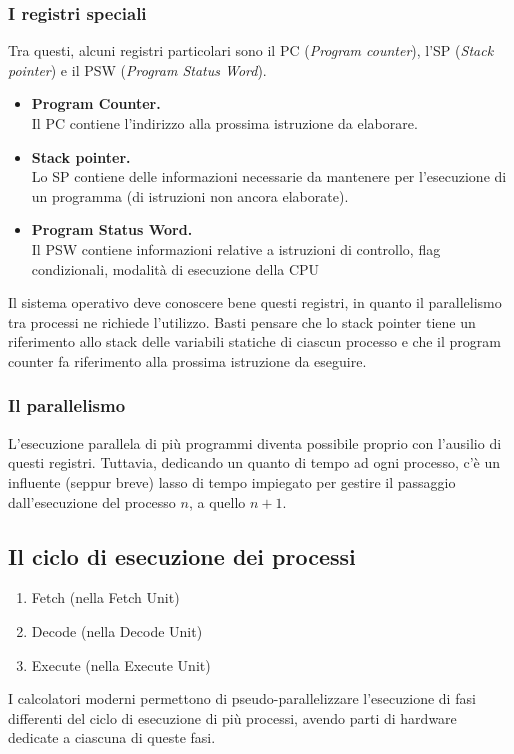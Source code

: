 \documentclass{report}
\begin{document}
\subsubsection{I registri speciali}
Tra questi, alcuni registri particolari sono il PC (\textit{Program counter}), l'SP (\textit{Stack pointer}) e il PSW (\textit{Program Status Word}).
\begin{itemize}
    \item \textbf{Program Counter.}\\
    Il PC contiene l'indirizzo alla prossima istruzione da elaborare.
    \item \textbf{Stack pointer.}\\
    Lo SP contiene delle informazioni necessarie da mantenere per l'esecuzione di un programma (di istruzioni non ancora elaborate).
    \item \textbf{Program Status Word.}\\
    Il PSW contiene informazioni relative a istruzioni di controllo, flag condizionali, modalità di esecuzione della CPU
\end{itemize}
Il sistema operativo deve conoscere bene questi registri, in quanto il parallelismo tra processi ne richiede l'utilizzo. Basti pensare che lo stack pointer tiene un riferimento allo stack delle variabili statiche di ciascun processo e che il program counter fa riferimento alla prossima istruzione da eseguire.

\subsubsection{Il parallelismo}
L'esecuzione parallela di più programmi diventa possibile proprio con l'ausilio di questi registri. Tuttavia, dedicando un quanto di tempo ad ogni processo, c'è un influente (seppur breve) lasso di tempo impiegato per gestire il passaggio dall'esecuzione del processo $n$, a quello $n+1$.

\subsection{Il ciclo di esecuzione dei processi}
\begin{enumerate}
    \item Fetch (nella Fetch Unit)
    \item Decode (nella Decode Unit)
    \item Execute (nella Execute Unit)
\end{enumerate}
I calcolatori moderni permettono di pseudo-parallelizzare l'esecuzione di fasi differenti del ciclo di esecuzione di più processi, avendo parti di hardware dedicate a ciascuna di queste fasi.
\end{document}
